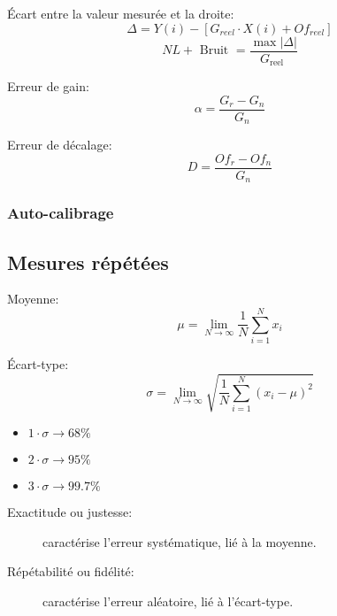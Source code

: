 \documentclass[10pt]{article} %
\begin{document}
\begin{multicols}{3}
\begin{flushleft}
				Écart entre la valeur mesurée et la droite:
				\[\Delta=Y(i)-\left[G_{r e e l} \cdot X(i)+O f_{r e e l}\right]\]
				\[N L+\text { Bruit }=\frac{\max |\Delta|}{G_{\text {reel }}}\]
				
				Erreur de gain:
				\[\alpha=\frac{G_{r}-G_{n}}{G_{n}}\]
				
				Erreur de décalage:
				\[D=\frac{O f_{r}-O f_{n}}{G_{n}}\]
				
			\subsubsection*{Auto-calibrage}
			
		
		
		\subsection*{Mesures répétées}
			
			Moyenne:
			\[\mu=\lim _{N \rightarrow \infty} \frac{1}{N} \sum_{i=1}^{N} x_{i}\]
			
			Écart-type:
			\[\sigma=\lim _{N \rightarrow \infty} \sqrt{\frac{1}{N} \sum_{i=1}^{N}\left(x_{i}-\mu\right)^{2}}\]
			
			\begin{itemize}
				\item $1 \cdot \sigma \rightarrow 68 \%$
				\item $2 \cdot \sigma \rightarrow 95 \%$
				\item $3 \cdot \sigma \rightarrow 99.7 \%$
			\end{itemize}
			
			\begin{description}
				\item [Exactitude ou justesse:] caractérise l'erreur systématique, lié à la moyenne.
				\item [Répétabilité ou fidélité:] caractérise l'erreur aléatoire, lié à l'écart-type.
			\end{description}
			

\end{flushleft}
\end{multicols}
\end{document}
